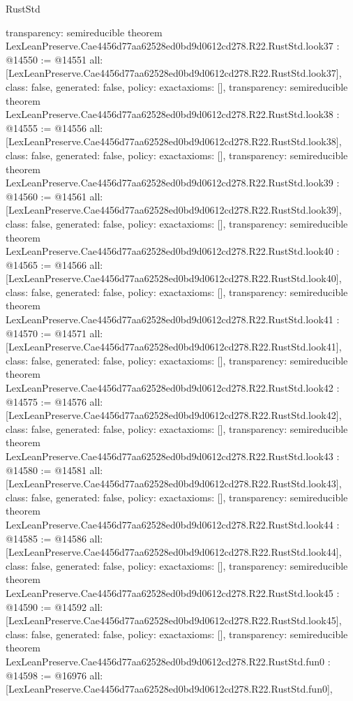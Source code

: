 \begin{lexlean}{RustStd}
\begin{coremodule}
{  transparency: semireducible
}
theorem LexLeanPreserve.Cae4456d77aa62528ed0bd9d0612cd278.R22.RustStd.look37 : @14550 := @14551 {
  all: [LexLeanPreserve.Cae4456d77aa62528ed0bd9d0612cd278.R22.RustStd.look37],
  class: false,
  generated: false,
  policy: exact{axioms: []},
  transparency: semireducible
}
theorem LexLeanPreserve.Cae4456d77aa62528ed0bd9d0612cd278.R22.RustStd.look38 : @14555 := @14556 {
  all: [LexLeanPreserve.Cae4456d77aa62528ed0bd9d0612cd278.R22.RustStd.look38],
  class: false,
  generated: false,
  policy: exact{axioms: []},
  transparency: semireducible
}
theorem LexLeanPreserve.Cae4456d77aa62528ed0bd9d0612cd278.R22.RustStd.look39 : @14560 := @14561 {
  all: [LexLeanPreserve.Cae4456d77aa62528ed0bd9d0612cd278.R22.RustStd.look39],
  class: false,
  generated: false,
  policy: exact{axioms: []},
  transparency: semireducible
}
theorem LexLeanPreserve.Cae4456d77aa62528ed0bd9d0612cd278.R22.RustStd.look40 : @14565 := @14566 {
  all: [LexLeanPreserve.Cae4456d77aa62528ed0bd9d0612cd278.R22.RustStd.look40],
  class: false,
  generated: false,
  policy: exact{axioms: []},
  transparency: semireducible
}
theorem LexLeanPreserve.Cae4456d77aa62528ed0bd9d0612cd278.R22.RustStd.look41 : @14570 := @14571 {
  all: [LexLeanPreserve.Cae4456d77aa62528ed0bd9d0612cd278.R22.RustStd.look41],
  class: false,
  generated: false,
  policy: exact{axioms: []},
  transparency: semireducible
}
theorem LexLeanPreserve.Cae4456d77aa62528ed0bd9d0612cd278.R22.RustStd.look42 : @14575 := @14576 {
  all: [LexLeanPreserve.Cae4456d77aa62528ed0bd9d0612cd278.R22.RustStd.look42],
  class: false,
  generated: false,
  policy: exact{axioms: []},
  transparency: semireducible
}
theorem LexLeanPreserve.Cae4456d77aa62528ed0bd9d0612cd278.R22.RustStd.look43 : @14580 := @14581 {
  all: [LexLeanPreserve.Cae4456d77aa62528ed0bd9d0612cd278.R22.RustStd.look43],
  class: false,
  generated: false,
  policy: exact{axioms: []},
  transparency: semireducible
}
theorem LexLeanPreserve.Cae4456d77aa62528ed0bd9d0612cd278.R22.RustStd.look44 : @14585 := @14586 {
  all: [LexLeanPreserve.Cae4456d77aa62528ed0bd9d0612cd278.R22.RustStd.look44],
  class: false,
  generated: false,
  policy: exact{axioms: []},
  transparency: semireducible
}
theorem LexLeanPreserve.Cae4456d77aa62528ed0bd9d0612cd278.R22.RustStd.look45 : @14590 := @14592 {
  all: [LexLeanPreserve.Cae4456d77aa62528ed0bd9d0612cd278.R22.RustStd.look45],
  class: false,
  generated: false,
  policy: exact{axioms: []},
  transparency: semireducible
}
theorem LexLeanPreserve.Cae4456d77aa62528ed0bd9d0612cd278.R22.RustStd.fun0 : @14598 := @16976 {
  all: [LexLeanPreserve.Cae4456d77aa62528ed0bd9d0612cd278.R22.RustStd.fun0],
}
\end{coremodule}
\end{lexlean}
